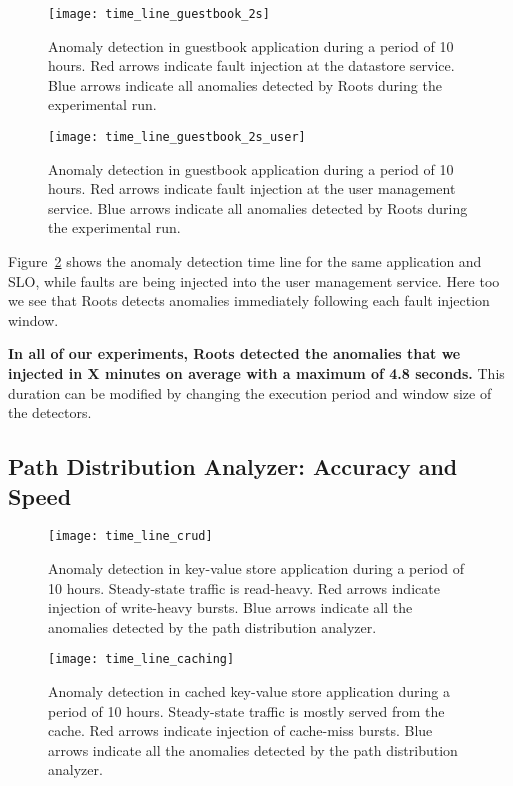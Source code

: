 \begin{figure}
\centering
\texttt{[image: time\_line\_guestbook\_2s]}
\caption{Anomaly detection in guestbook application during a period of 10 hours. Red arrows indicate fault injection 
at the datastore service. Blue arrows indicate all anomalies detected by Roots during the experimental run.}
\label{fig:time_line_guestbook_2s}
\end{figure}

\begin{figure}
\centering
\texttt{[image: time\_line\_guestbook\_2s\_user]}
\caption{Anomaly detection in guestbook application during a period of 10 hours. Red arrows indicate fault injection
at the user management service. Blue arrows indicate all anomalies detected by Roots during the experimental run.}
\label{fig:time_line_guestbook_2s_user}
\end{figure}

Figure~\ref{fig:time_line_guestbook_2s_user} shows the anomaly detection time line for the 
same application and SLO, while faults are being injected into the user management service.
Here too we see that Roots detects anomalies immediately following each fault injection window.

\textbf{In all of our experiments, Roots detected the anomalies that we injected 
in X minutes on average with a maximum of 4.8 seconds.}
This duration can be modified by changing the execution period and 
window size of the
detectors. 


\subsection{Path Distribution Analyzer: Accuracy and Speed}
\begin{figure}
\centering
\texttt{[image: time\_line\_crud]}
\caption{Anomaly detection in key-value store application during a period of 10 hours. Steady-state traffic is read-heavy. Red arrows
indicate injection of write-heavy bursts. Blue arrows indicate all the anomalies detected by the path distribution
analyzer.}
\label{fig:time_line_crud}
\end{figure}

\begin{figure}
\centering
\texttt{[image: time\_line\_caching]}
\caption{Anomaly detection in cached key-value store application during a period of 10 hours. Steady-state traffic is mostly
served from the cache. Red arrows
indicate injection of cache-miss bursts. Blue arrows indicate all the anomalies detected by the path distribution
analyzer.}
\label{fig:time_line_caching}
\end{figure}

